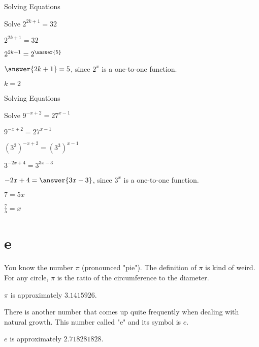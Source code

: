 \documentclass{ximera}
\begin{document}
\begin{example} Solving Equations


Solve $2^{2k+1} = 32$


\begin{explanation}
$2^{2k+1} = 32$

$2^{2k+1} = 2^{\answer{5}}$

$\answer{2k + 1} = 5$, since $2^x$ is a one-to-one function.

$k = 2$
\end{explanation}
\end{example}






\begin{example} Solving Equations


Solve $9^{-x + 2} = 27^{x-1}$


\begin{explanation}

$9^{-x + 2} = 27^{x-1}$

$(3^2)^{-x + 2} = (3^3)^{x-1}$

$3^{-2x+4} = 3^{3x-3}$    

$-2x + 4 = \answer{3x - 3}$, since $3^x$ is a one-to-one function.

$7 = 5x$


$\frac{7}{5} = x$
\end{explanation}
\end{example}














\section{e}


You know the number $\pi$ (pronounced "pie").  The definition of $\pi$ is kind of weird.  For any circle, $\pi$ is the ratio of the circumference to the diameter.

$\pi$ is approximately $3.1415926$.





There is another number that comes up quite frequently when dealing with natural growth.  This number called "e" and its symbol is $e$.

$e$ is approximately $2.718281828$.
\end{document}
